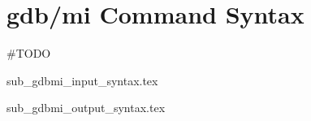 \section{gdb/mi Command Syntax}
\#TODO

{sub_gdbmi_input_syntax.tex}

{sub_gdbmi_output_syntax.tex}
